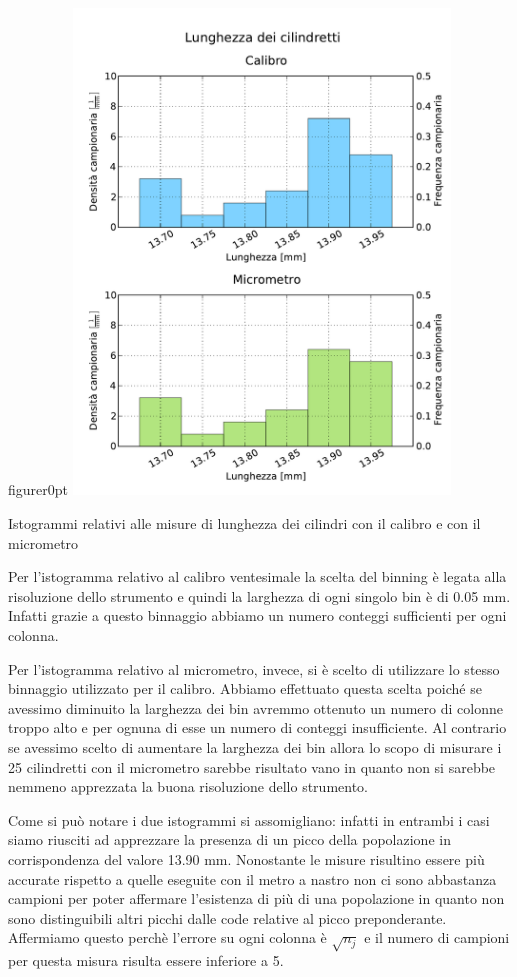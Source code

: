 \begin{wrapfloat}{figure}{r}{0pt}
	\centering
	\includegraphics[width=100mm]{grafici/Cilindretti_calibro_micrometro.pdf}
	\caption{Istogrammi relativi alle misure di lunghezza dei cilindri con il calibro e con il micrometro}
	\label{fig:calmic}
\end{wrapfloat}

Per l'istogramma relativo al calibro ventesimale la scelta del binning è legata
alla risoluzione dello strumento e quindi la larghezza di ogni singolo
bin è di 0.05 mm. Infatti grazie a questo binnaggio abbiamo un numero
conteggi sufficienti per ogni colonna.

Per l'istogramma relativo al micrometro, invece, si è scelto di utilizzare lo stesso
binnaggio utilizzato per il calibro. Abbiamo effettuato questa scelta poiché se avessimo
diminuito la larghezza dei bin avremmo ottenuto un numero di colonne troppo alto e per
ognuna di esse un numero di conteggi insufficiente. Al contrario se avessimo scelto
di aumentare la larghezza dei bin allora lo scopo di misurare i 25 cilindretti
con il micrometro sarebbe risultato vano in quanto non si sarebbe nemmeno apprezzata
la buona risoluzione dello strumento.

Come si può notare i due istogrammi si assomigliano: infatti in entrambi i casi
siamo riusciti ad apprezzare la presenza di un picco della popolazione in
corrispondenza del valore 13.90 mm. Nonostante le misure risultino essere
più accurate rispetto a quelle eseguite con il metro a nastro non ci sono
abbastanza campioni per poter affermare l'esistenza di più di una popolazione
in quanto non sono distinguibili altri picchi dalle code relative al picco preponderante.
Affermiamo questo perchè l'errore su ogni colonna è $\sqrt{n_j}$ %
e il numero di campioni per questa misura risulta essere inferiore a 5.

